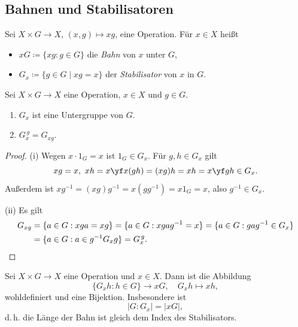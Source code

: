 \documentclass[11pt]{article}
\begin{document}
\subsection{Bahnen und Stabilisatoren}

\begin{definition}\Theorem
  Sei $X \times G \to X$, $(x, g) \mapsto xg$, eine Operation. Für $x \in X$ heißt
  \begin{itemize}
    \item $xG \coloneqq \{xg : g \in G\}$ die \emph{Bahn} von $x$ unter $G$,
    \item $G_x \coloneqq \{g \in G \mid xg = x\}$ der \emph{Stabilisator} von $x$ in $G$.
  \end{itemize}
\end{definition}

\begin{lemma}[Stabilisatoren]\Theorem
  Sei $X \times G \to X$ eine Operation, $x \in X$ und $g \in G$.
  \begin{enumerate}[label=(\roman*)]
    \item $G_x$ ist eine Untergruppe von $G$.
    \item $G_x^{\,g} = G_{xg}$.
  \end{enumerate}
\end{lemma}

\begin{proof}
  (i) Wegen $x \cdot 1_G = x$ ist $1_G \in G_x$. Für $g, h \in G_x$ gilt
  \[ xg = x,\ xh = x \yf x(gh) = (xg)h = xh = x \yf gh \in G_x. \]
  Außerdem ist $x g^{-1} = (xg) g^{-1} = x(g g^{-1}) = x 1_G = x$, also $g^{-1} \in G_x$.

  (ii) Es gilt
  \begin{align*}
    G_{xg} &= \{a \in G : xga = xg\} = \{a \in G : xgag^{-1} = x\} = \{a \in G : gag^{-1} \in G_x\} \\
    &= \{a \in G : a \in g^{-1} G_x g\} = G_x^{\,g}. \qedhere
  \end{align*}
\end{proof}

\begin{lemma}\Theorem
  Sei $X \times G \to X$ eine Operation und $x \in X$. Dann ist die Abbildung
  \[ \{G_x h : h \in G\} \to xG, \quad G_x h \mapsto xh, \]
  wohldefiniert und eine Bijektion. Insbesondere ist
  \[ \lvert G : G_x \rvert = \lvert xG \rvert, \]
  d.\,h. die Länge der Bahn ist gleich dem Index des Stabilisators.
\end{lemma}
\end{document}

